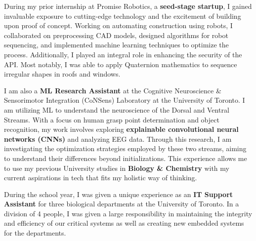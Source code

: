 \documentclass[10.5pt,a4]{article}
\begin{document}
During my prior internship at Promise Robotics, a \textbf{seed-stage startup}, I gained invaluable exposure to cutting-edge technology and the excitement of building upon proof of concept. Working on automating construction using robots, I collaborated on preprocessing CAD models, designed algorithms for robot sequencing, and implemented machine learning techniques to optimize the process. Additionally, I played an integral role in enhancing the security of the API. Most notably, I was able to apply Quaternion mathematics to sequence irregular shapes in roofs and windows.

I am also a \textbf{ML Research Assistant} at the Cognitive Neuroscience \& Sensorimotor Integration (CoNSens) Laboratory at the University of Toronto. I am utilizing ML to understand the neuroscience of the Dorsal and Ventral Streams. With a focus on human grasp point determination and object recognition, my work involves exploring \textbf{explainable convolutional neural networks (CNNs)} and analyzing EEG data. Through this research, I am investigating the optimization strategies employed by these two streams, aiming to understand their differences beyond initializations. This experience allows me to use my previous University studies in \textbf{Biology \& Chemistry} with my current aspirations in tech that fits my holistic way of thinking. 

During the school year, I was given a unique experience as an \textbf{IT Support Assistant} for three biological departments at the University of Toronto. In a division of 4 people, I was given a large responsibility in maintaining the integrity and efficiency of our critical systems as well as creating new embedded systems for the departments. 
\end{document}
